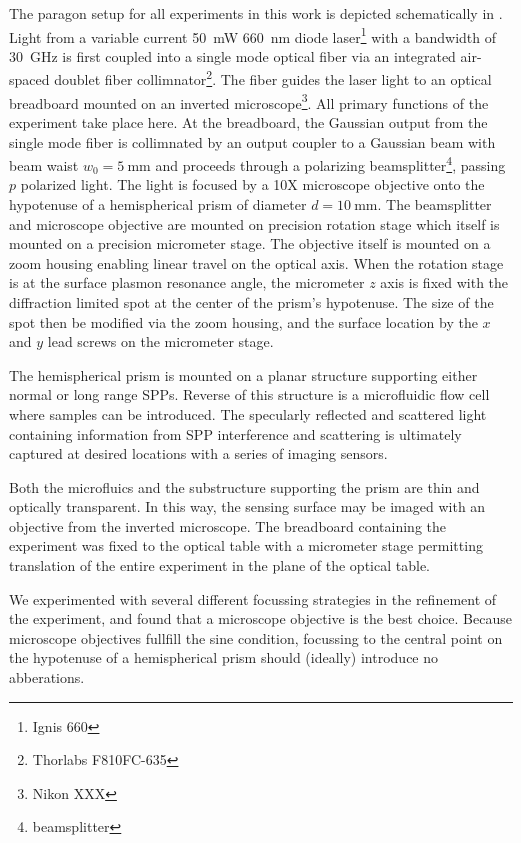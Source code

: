 The paragon setup for all experiments in this work is depicted
schematically in .  Light from a variable
current \SI{50}{\milli\watt} \SI{660}{\nano\meter} diode
laser\footnote{Ignis 660} with a bandwidth of \SI{30}{\giga\hertz} is first
coupled into a single mode optical fiber via an integrated air-spaced
doublet fiber collimnator\footnote{Thorlabs F810FC-635}.  The fiber guides
the laser light to an optical breadboard mounted on an inverted
microscope\footnote{Nikon XXX}.  All primary functions of the experiment
take place here.  At the breadboard, the Gaussian output from the single
mode fiber is collimnated by an output coupler to a Gaussian beam with beam
waist $w_0=\SI{5}{\milli\meter}$ and proceeds through a polarizing
beamsplitter\footnote{beamsplitter}, passing $p$ polarized light.  The
light is focused by a 10X microscope objective onto the hypotenuse of a
hemispherical prism of diameter $d=\SI{10}{\milli\meter}$.  The
beamsplitter and microscope objective are mounted on precision rotation
stage which itself is mounted on a precision micrometer stage.  The
objective itself is mounted on a zoom housing enabling linear travel on the
optical axis.  When the rotation stage is at the surface plasmon resonance
angle, the micrometer $z$ axis is fixed with the diffraction limited spot
at the center of the prism's hypotenuse.  The size of the spot then be
modified via the zoom housing, and the surface location by the $x$ and $y$
lead screws on the micrometer stage.  

The hemispherical prism is mounted on a planar structure supporting
either normal or long range SPPs.  Reverse of this structure is a
microfluidic flow cell where samples can be introduced.  The specularly
reflected and scattered light containing information from SPP interference
and scattering is ultimately captured at desired locations with a series of imaging
sensors.

Both the microfluics and the substructure supporting the prism are thin and
optically transparent.  In this way, the sensing surface may be imaged with
an objective from the inverted microscope.  The breadboard containing the
experiment was fixed to the optical table with a micrometer stage
permitting translation of the entire experiment in the plane of the optical
table.

We experimented with several different focussing strategies in the
refinement of the experiment, and found that a microscope objective is the
best choice.  Because microscope objectives fullfill the sine condition,
focussing to the central point on the hypotenuse of a hemispherical prism
should (ideally) introduce no abberations.

